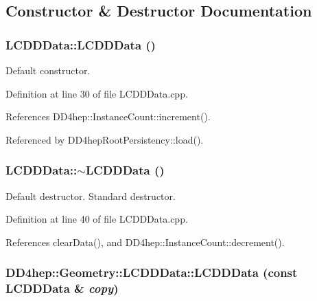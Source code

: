 \subsection{Constructor \& Destructor Documentation}
\hypertarget{class_d_d4hep_1_1_geometry_1_1_l_c_d_d_data_a708e690646050f36f621ac61052b07cd}{
\subsubsection[{LCDDData}]{\setlength{\rightskip}{0pt plus 5cm}LCDDData::LCDDData ()}}
\label{class_d_d4hep_1_1_geometry_1_1_l_c_d_d_data_a708e690646050f36f621ac61052b07cd}


Default constructor. 

Definition at line 30 of file LCDDData.cpp.

References DD4hep::InstanceCount::increment().

Referenced by DD4hepRootPersistency::load().\hypertarget{class_d_d4hep_1_1_geometry_1_1_l_c_d_d_data_ac0b2ce6ff949288f48cdffc399f21808}{
\subsubsection[{$\sim$LCDDData}]{\setlength{\rightskip}{0pt plus 5cm}LCDDData::$\sim$LCDDData ()}}
\label{class_d_d4hep_1_1_geometry_1_1_l_c_d_d_data_ac0b2ce6ff949288f48cdffc399f21808}


Default destructor. Standard destructor. 

Definition at line 40 of file LCDDData.cpp.

References clearData(), and DD4hep::InstanceCount::decrement().\hypertarget{class_d_d4hep_1_1_geometry_1_1_l_c_d_d_data_abadb40a29dfebc153462c81d351cadeb}{
\subsubsection[{LCDDData}]{\setlength{\rightskip}{0pt plus 5cm}DD4hep::Geometry::LCDDData::LCDDData (const {\bf LCDDData} \& {\em copy})}}
\label{class_d_d4hep_1_1_geometry_1_1_l_c_d_d_data_abadb40a29dfebc153462c81d351cadeb}


